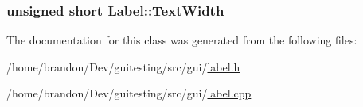 \hypertarget{class_label_ad85ba57f87b6a659bcb1e3af683eefc}{
\subsubsection[{TextWidth}]{\setlength{\rightskip}{0pt plus 5cm}unsigned short {\bf Label::TextWidth}}}
\label{class_label_ad85ba57f87b6a659bcb1e3af683eefc}




The documentation for this class was generated from the following files:\begin{CompactItemize}
\item 
/home/brandon/Dev/guitesting/src/gui/\hyperlink{label_8h}{label.h}\item 
/home/brandon/Dev/guitesting/src/gui/\hyperlink{label_8cpp}{label.cpp}\end{CompactItemize}

